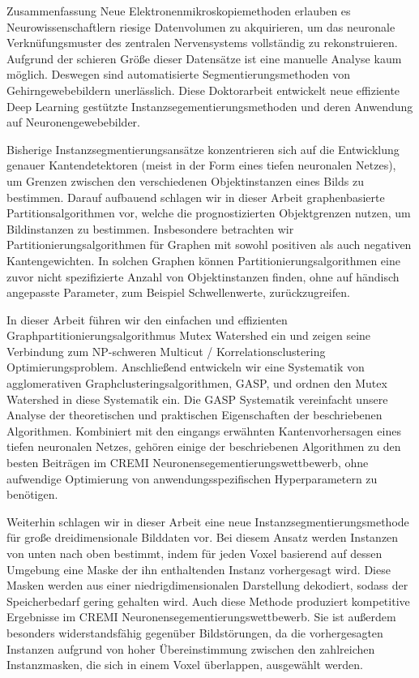 \begin{coverpage}{Zusammenfassung}
Neue Elektronenmikroskopiemethoden erlauben es Neurowissenschaftlern riesige Datenvolumen zu akquirieren, um das neuronale Verkn\"ufungsmuster des zentralen Nervensystems vollst\"andig zu rekonstruieren. Aufgrund der schieren Gr\"o{\ss}e dieser Datens\"atze ist eine manuelle Analyse kaum m\"oglich. Deswegen sind automatisierte Segmentierungsmethoden von Gehirngewebebildern unerl\"asslich. Diese Doktorarbeit entwickelt neue effiziente Deep Learning gest\"utzte Instanzsegementierungsmethoden und deren Anwendung auf Neuronengewebebilder.
 
Bisherige Instanzsegmentierungsans\"atze konzentrieren sich auf die Entwicklung genauer Kantendetektoren (meist in der Form eines tiefen neuronalen Netzes), um Grenzen zwischen den verschiedenen Objektinstanzen eines Bilds zu bestimmen. Darauf aufbauend schlagen wir in dieser Arbeit graphenbasierte Partitionsalgorithmen vor, welche die prognostizierten Objektgrenzen nutzen, um Bildinstanzen zu bestimmen. Insbesondere betrachten wir Partitionierungsalgorithmen f\"ur Graphen mit sowohl positiven als auch negativen Kantengewichten. In solchen Graphen k\"onnen Partitionierungsalgorithmen eine zuvor nicht spezifizierte Anzahl von Objektinstanzen finden, ohne auf h\"andisch angepasste Parameter, zum Beispiel Schwellenwerte, zur\"uckzugreifen.

In dieser Arbeit f\"uhren wir den einfachen und effizienten Graphpartitionierungsalgorithmus Mutex Watershed ein und zeigen seine Verbindung zum NP-schweren Multicut / Korrelationsclustering Optimierungsproblem. Anschlie{\ss}end entwickeln wir eine Systematik von agglomerativen Graphclusteringsalgorithmen, GASP, und ordnen den Mutex Watershed in diese Systematik ein. Die GASP Systematik vereinfacht unsere Analyse der theoretischen und praktischen Eigenschaften der beschriebenen Algorithmen. Kombiniert mit den eingangs erw\"ahnten Kantenvorhersagen eines tiefen neuronalen Netzes, geh\"oren einige der beschriebenen Algorithmen zu den besten Beitr\"agen im CREMI Neuronensegementierungswettbewerb, ohne aufwendige Optimierung von anwendungsspezifischen Hyperparametern zu ben\"otigen.

Weiterhin schlagen wir in dieser Arbeit eine neue Instanzsegmentierungsmethode f\"ur gro{\ss}e dreidimensionale Bilddaten vor. Bei diesem Ansatz werden Instanzen von unten nach oben bestimmt, indem f\"ur jeden Voxel basierend auf dessen Umgebung eine Maske der ihn enthaltenden Instanz vorhergesagt wird. Diese Masken werden aus einer niedrigdimensionalen Darstellung dekodiert, sodass der Speicherbedarf gering gehalten wird. Auch diese Methode produziert kompetitive Ergebnisse im CREMI Neuronensegementierungswettbewerb. Sie ist au{\ss}erdem besonders widerstandsf\"ahig gegen\"uber Bildst\"orungen, da die vorhergesagten Instanzen aufgrund von hoher \"Ubereinstimmung zwischen den zahlreichen Instanzmasken, die sich in einem Voxel \"uberlappen, ausgew\"ahlt werden.
\end{coverpage}
